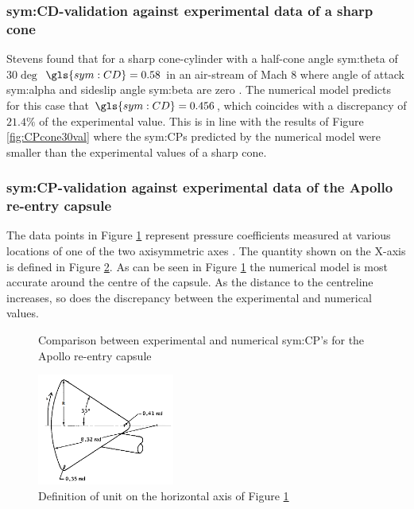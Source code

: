 \subsubsection{\gls{sym:CD}-validation against experimental data of a sharp cone}
\label{subsubsec:valsharpconeCD}
Stevens found that for a sharp cone-cylinder with a half-cone angle \gls{sym:theta} of $30\deg$ $\gls{sym:CD}=0.58$ in an air-stream of Mach $8$ where angle of attack \gls{sym:alpha} and sideslip angle \gls{sym:beta} are zero \cite{Stevens1950,AndersonJr.2007}. The numerical model predicts for this case that $\gls{sym:CD}=0.456$, which coincides with a discrepancy of $21.4\%$ of the experimental value. This is in line with the results of Figure \ref{fig:CPcone30val} where the \glspl{sym:CP} predicted by the numerical model were smaller than the experimental values of a sharp cone.

\subsubsection{\gls{sym:CP}-validation against experimental data of the Apollo re-entry capsule}
\label{subsubsec:Apollo_validation}
The data points in Figure \ref{fig:Apollo_cp} represent pressure coefficients measured at various locations of one of the two axisymmetric axes \cite{Bertin1966}. The quantity shown on the X-axis is defined in Figure \ref{fig:Apollo_y}. As can be seen in Figure \ref{fig:Apollo_cp} the numerical model is most accurate around the centre of the capsule. As the distance to the centreline increases, so does the discrepancy between the experimental and numerical values.

\begin{figure}[H]
	\centering
	
	\caption{Comparison between experimental and numerical \gls{sym:CP}'s for the Apollo re-entry capsule}
	\label{fig:Apollo_cp}
\end{figure}

\begin{figure}[H]
	\centering
	\includegraphics[width=0.4\textwidth]{./Figure/Apollo_model}
	\caption{Definition of unit on the horizontal axis of Figure \ref{fig:Apollo_cp} \cite{Bertin1966}}
	\label{fig:Apollo_y}
\end{figure}

